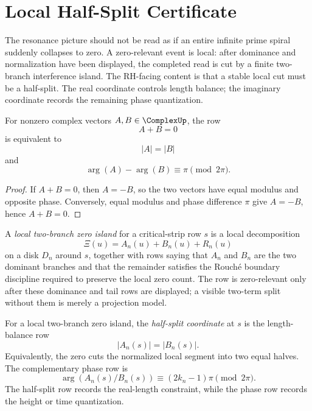 \section{Local Half-Split Certificate}
\label{sec:unified-reality-local-half-split-certificate}

The resonance picture should not be read as if an entire infinite prime
spiral suddenly collapses to zero.  A zero-relevant event is local: after
dominance and normalization have been displayed, the completed read is
cut by a finite two-branch interference island.  The RH-facing content is
that a stable local cut must be a half-split.  The real coordinate
controls length balance; the imaginary coordinate records the remaining
phase quantization.

\begin{theorem}
\label{thm:unified-reality-two-vector-silence-equal-length-opposite-phase}
For nonzero complex vectors $A,B\in\ComplexUp$, the row
$$
A+B=0
$$
is equivalent to
$$
|A|=|B|
$$
and
$$
\arg(A)-\arg(B)\equiv\pi\pmod{2\pi}.
$$
\end{theorem}

\begin{proof}
If $A+B=0$, then $A=-B$, so the two vectors have equal modulus and
opposite phase.  Conversely, equal modulus and phase difference $\pi$
give $A=-B$, hence $A+B=0$.
\end{proof}


\begin{definition}
\label{def:unified-reality-local-two-branch-zero-island}
A \emph{local two-branch zero island} for a critical-strip row $s$ is a
local decomposition
$$
\Xi(u)=A_n(u)+B_n(u)+R_n(u)
$$
on a disk $D_n$ around $s$, together with rows saying that $A_n$ and
$B_n$ are the two dominant branches and that the remainder satisfies the
Rouch\'e boundary discipline required to preserve the local zero count.
The row is zero-relevant only after these dominance and tail rows are
displayed; a visible two-term split without them is merely a projection
model.
\end{definition}

\begin{definition}
\label{def:unified-reality-half-split-coordinate}
For a local two-branch zero island, the \emph{half-split coordinate} at
$s$ is the length-balance row
$$
|A_n(s)|=|B_n(s)|.
$$
Equivalently, the zero cuts the normalized local segment into two equal
halves.  The complementary phase row is
$$
\arg(A_n(s)/B_n(s))\equiv(2k_n-1)\pi
\pmod{2\pi}.
$$
The half-split row records the real-length constraint, while the phase
row records the height or time quantization.
\end{definition}

